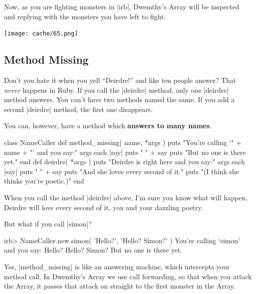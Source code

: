 \documentclass[12pt,twoside]{report}
\begin{document}
Now, as you are fighting monsters in \rubyinline|irb|,
Dwemthy's Array will be inspected and replying with the monsters you
have left to fight.

	\texttt{[image: cache/65.png]}



\subsection{Method Missing}



Don't you hate it when you yell ``Deirdre!'' and like ten people
answer?  That {\em never} happens in Ruby.  If you call the
\rubyinline|deirdre| method, only one
\rubyinline|deirdre| method answers.  You can't have
two methods named the same.  If you add a second
\rubyinline|deirdre| method, the first one disappears.

You can, however, have a method which {\bf answers to many names}.


\begin{rubycode}

 class NameCaller
   def method_missing( name, *args )
     puts "You're calling `" + name + "' and you say:"
     args.each { |say| puts "  " + say }
     puts "But no one is there yet."
   end
   def deirdre( *args )
     puts "Deirdre is right here and you say:"
     args.each { |say| puts "  " + say }
     puts "And she loves every second of it."
     puts "(I think she thinks you're poetic.)"
 end

\end{rubycode}


When you call the method \rubyinline|deirdre| above,
I'm sure you know what will happen.  Deirdre will love every second of
it, you and your dazzling poetry.

But what if you call \rubyinline|simon|?


\begin{consolecode}

 irb> NameCaller.new.simon( 'Hello?', 'Hello? Simon?' )
 You're calling `simon' and you say:
   Hello?
   Hello? Simon?
 But no one is there yet.

\end{consolecode}


Yes, \rubyinline|method_missing| is like an answering
machine, which intercepts your method call.  In Dwemthy's Array we use
call forwarding, so that when you attack the Array, it passes that
attack on straight to the first monster in the Array.
\end{document}
